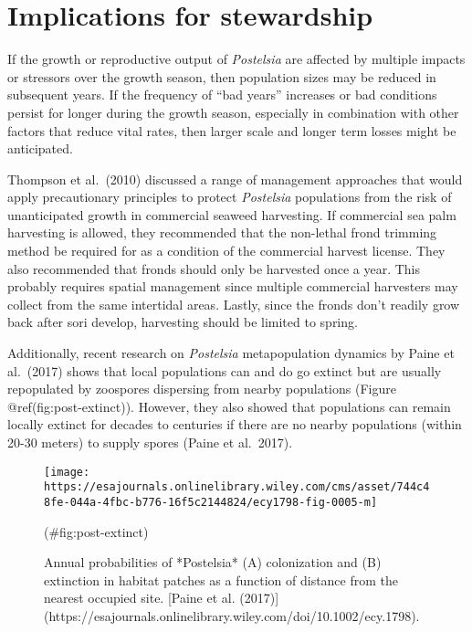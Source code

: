 \documentclass[
]{article}
\begin{document}
\newpage

\hypertarget{implications-for-stewardship}{%
\section{Implications for stewardship}\label{implications-for-stewardship}}

If the growth or reproductive output of \emph{Postelsia} are affected by multiple impacts or stressors over the growth season, then population sizes may be reduced in subsequent years. If the frequency of ``bad years'' increases or bad conditions persist for longer during the growth season, especially in combination with other factors that reduce vital rates, then larger scale and longer term losses might be anticipated.

Thompson et al.~(2010) discussed a range of management approaches that would apply precautionary principles to protect \emph{Postelsia} populations from the risk of unanticipated growth in commercial seaweed harvesting. If commercial sea palm harvesting is allowed, they recommended that the non-lethal frond trimming method be required for as a condition of the commercial harvest license. They also recommended that fronds should only be harvested once a year. This probably requires spatial management since multiple commercial harvesters may collect from the same intertidal areas. Lastly, since the fronds don't readily grow back after sori develop, harvesting should be limited to spring.

Additionally, recent research on \emph{Postelsia} metapopulation dynamics by Paine et al.~(2017) shows that local populations can and do go extinct but are usually repopulated by zoospores dispersing from nearby populations (Figure @ref(fig:post-extinct)). However, they also showed that populations can remain locally extinct for decades to centuries if there are no nearby populations (within 20-30 meters) to supply spores (Paine et al.~2017).

\begin{figure}

\texttt{[image: https://esajournals.onlinelibrary.wiley.com/cms/asset/744c48fe-044a-4fbc-b776-16f5c2144824/ecy1798-fig-0005-m]} \hfill{}

\caption{Annual probabilities of *Postelsia* (A) colonization and (B) extinction in habitat patches as a function of distance from the nearest occupied site. [Paine et al. (2017)](https://esajournals.onlinelibrary.wiley.com/doi/10.1002/ecy.1798).}(\#fig:post-extinct)
\end{figure}
\end{document}
